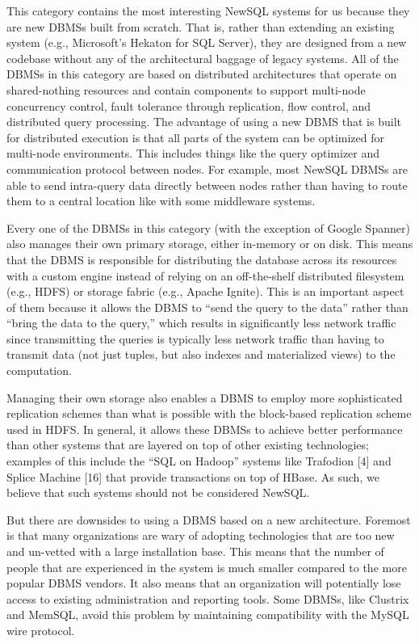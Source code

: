 \documentclass[a4paper,11pt,twoside,openright]{article}
\begin{document}
This category contains the most interesting NewSQL systems for us
because they are new DBMSs built from scratch. That is, rather than
extending an existing system (e.g., Microsoft's Hekaton for SQL Server),
they are designed from a new codebase without any of the architectural
baggage of legacy systems. All of the DBMSs in this category are based
on distributed architectures that operate on shared-nothing resources
and contain components to support multi-node concurrency control, fault
tolerance through replication, flow control, and distributed query
processing. The advantage of using a new DBMS that is built for
distributed execution is that all parts of the system can be optimized
for multi-node environments. This includes things like the query
optimizer and communication protocol between nodes. For example, most
NewSQL DBMSs are able to send intra-query data directly between nodes
rather than having to route them to a central location like with some
middleware systems.

Every one of the DBMSs in this category (with the exception of Google
Spanner) also manages their own primary storage, either in-memory or on
disk. This means that the DBMS is responsible for distributing the
database across its resources with a custom engine instead of relying on
an off-the-shelf distributed filesystem (e.g., HDFS) or storage fabric
(e.g., Apache Ignite). This is an important aspect of them because it
allows the DBMS to ``send the query to the data'' rather than ``bring
the data to the query,'' which results in significantly less network
traffic since transmitting the queries is typically less network traffic
than having to transmit data (not just tuples, but also indexes and
materialized views) to the computation.

Managing their own storage also enables a DBMS to employ more
sophisticated replication schemes than what is possible with the
block-based replication scheme used in HDFS. In general, it allows these
DBMSs to achieve better performance than other systems that are layered
on top of other existing technologies; examples of this include the
``SQL on Hadoop'' systems like Trafodion {[}4{]} and Splice Machine
{[}16{]} that provide transactions on top of HBase. As such, we believe
that such systems should not be considered NewSQL.

But there are downsides to using a DBMS based on a new architecture.
Foremost is that many organizations are wary of adopting technologies
that are too new and un-vetted with a large installation base. This
means that the number of people that are experienced in the system is
much smaller compared to the more popular DBMS vendors. It also means
that an organization will potentially lose access to existing
administration and reporting tools. Some DBMSs, like Clustrix and
MemSQL, avoid this problem by maintaining compatibility with the MySQL
wire protocol.
\end{document}
